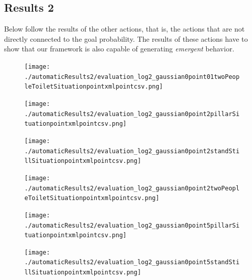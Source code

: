 \documentclass[11pt]{book}
\begin{document}
\subsection{Results 2}
Below follow the results of the other actions, that is, the actions that are not directly connected to the goal probability. The results of these actions have to show that our framework is also capable of generating \emph{emergent} behavior.

\begin{figure}
\centering
\texttt{[image: ./automaticResults2/evaluation\_log2\_gaussian0point01twoPeopleToiletSituationpointxmlpointcsv.png]}
\label{evaluation_log2_gaussian0point01twoPeopleToiletSituationpointxmlpointcsv}
\end{figure}

\begin{figure}
\centering
\texttt{[image: ./automaticResults2/evaluation\_log2\_gaussian0point2pillarSituationpointxmlpointcsv.png]}
\label{evaluation_log2_gaussian0point2pillarSituationpointxmlpointcsv}
\end{figure}

\begin{figure}
\centering
\texttt{[image: ./automaticResults2/evaluation\_log2\_gaussian0point2standStillSituationpointxmlpointcsv.png]}
\label{evaluation_log2_gaussian0point2standStillSituationpointxmlpointcsv}
\end{figure}

\begin{figure}
\centering
\texttt{[image: ./automaticResults2/evaluation\_log2\_gaussian0point2twoPeopleToiletSituationpointxmlpointcsv.png]}
\label{evaluation_log2_gaussian0point2twoPeopleToiletSituationpointxmlpointcsv}
\end{figure}

\begin{figure}
\centering
\texttt{[image: ./automaticResults2/evaluation\_log2\_gaussian0point5pillarSituationpointxmlpointcsv.png]}
\label{evaluation_log2_gaussian0point5pillarSituationpointxmlpointcsv}
\end{figure}

\begin{figure}
\centering
\texttt{[image: ./automaticResults2/evaluation\_log2\_gaussian0point5standStillSituationpointxmlpointcsv.png]}
\label{evaluation_log2_gaussian0point5standStillSituationpointxmlpointcsv}
\end{figure}
\end{document}
